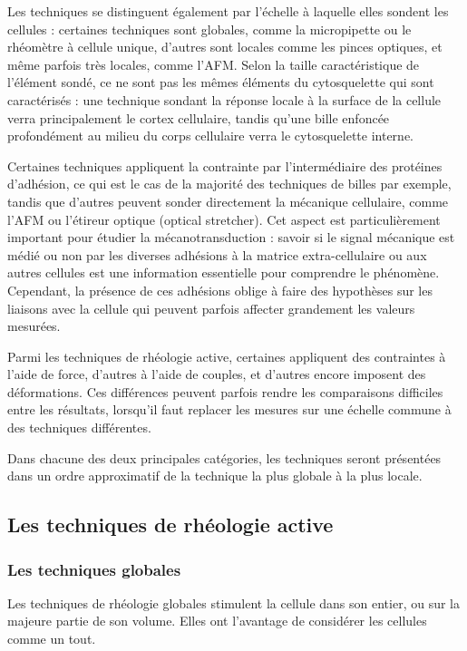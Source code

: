 \documentclass{report}
\begin{document}
Les techniques se distinguent également par l'échelle à laquelle elles sondent les cellules : certaines techniques sont globales, comme la micropipette ou le rhéomètre à cellule unique, d'autres sont locales comme les pinces optiques, et même parfois très locales, comme l'AFM. 
Selon la taille caractéristique de l'élément sondé, ce ne sont pas les mêmes éléments du cytosquelette qui sont caractérisés : une technique sondant la réponse locale à la surface de la cellule verra principalement le cortex cellulaire, tandis qu'une bille enfoncée profondément au milieu du corps cellulaire verra le cytosquelette interne. 

Certaines techniques appliquent la contrainte par l'intermédiaire des protéines d'adhésion, ce qui est le cas de la majorité des techniques de billes par exemple, tandis que d'autres peuvent sonder directement la mécanique cellulaire, comme l'AFM ou l'étireur optique (optical stretcher). Cet aspect est particulièrement important pour étudier la mécanotransduction : savoir si le signal mécanique est médié ou non par les diverses adhésions à la matrice extra-cellulaire ou aux autres cellules est une information essentielle pour comprendre le phénomène. 
Cependant, la présence de ces adhésions oblige à faire des hypothèses sur les liaisons avec la cellule qui peuvent parfois affecter grandement les valeurs mesurées. 

Parmi les techniques de rhéologie active, certaines appliquent des contraintes à l'aide de force, d'autres à l'aide de couples, et d'autres encore imposent des déformations. Ces différences peuvent parfois rendre les comparaisons difficiles entre les résultats, lorsqu'il faut replacer les mesures sur une échelle commune à des techniques différentes. 

Dans chacune des deux principales catégories, les techniques seront présentées dans un ordre approximatif de la technique la plus globale à la plus locale. 

\subsection{Les techniques de rhéologie active}
\subsubsection{Les techniques globales}
Les techniques de rhéologie globales stimulent la cellule dans son entier, ou sur la majeure partie de son volume. Elles ont l'avantage de considérer les cellules comme un tout. 
\end{document}
